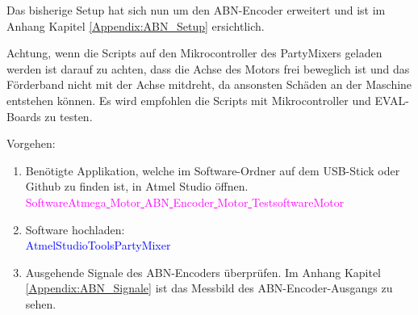 Das bisherige Setup hat sich nun um den ABN-Encoder erweitert und ist im Anhang Kapitel \ref{Appendix:ABN_Setup} ersichtlich.

Achtung, wenn die Scripts auf den Mikrocontroller des PartyMixers geladen werden ist darauf zu achten, dass die Achse des Motors frei beweglich ist und das Förderband nicht mit der Achse mitdreht, da ansonsten Schäden an der Maschine entstehen können. Es wird empfohlen die Scripts mit Mikrocontroller und EVAL-Boards zu testen.

Vorgehen:
\begin{enumerate}
\item Benötigte Applikation, welche im Software-Ordner auf dem USB-Stick oder Github \cite{aebi_projekt-6softwareatmega_2020} zu finden ist, in Atmel Studio öffnen.\\
\textcolor{magenta}{Software\textrightarrow Atmega\underline{ }Motor\underline{ }ABN\underline{ }Encoder\underline{ }Motor\underline{ }Testsoftware\textrightarrow Motor}\\

\item Software hochladen:\\
\textcolor{blue}{AtmelStudio\textrightarrow Tools\textrightarrow PartyMixer}\\

\item Ausgehende Signale des ABN-Encoders überprüfen. Im Anhang Kapitel \ref{Appendix:ABN_Signale} ist das Messbild des ABN-Encoder-Ausgangs zu sehen.

\end{enumerate}